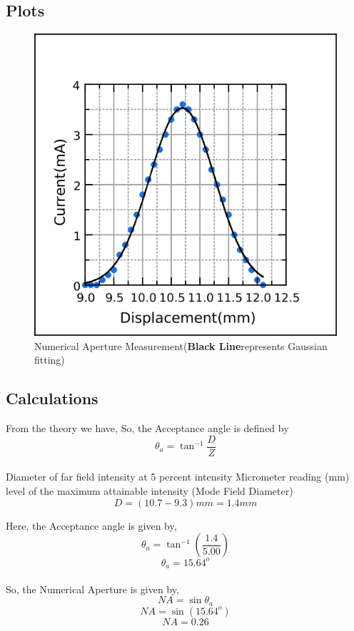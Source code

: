 \subsection{Plots}
\begin{figure}[H]
        \centering
        \includegraphics[width = 12 cm]{chapters/NA.png}
        \caption{Numerical Aperture Measurement(\textbf{Black Line}represents Gaussian fitting)}
    \end{figure}
    
\subsection{Calculations}

From the theory we have,
    So, the Acceptance angle is defined by \\
    $$ \theta_{a} = \tan^{-1}\frac{D}{Z}$$ \\
   
    Diameter of far field intensity at 5 percent intensity Micrometer reading (mm) level of the maximum attainable intensity (Mode Field Diameter)
    $$ D = (10.7 - 9.3) mm = 1.4  mm$$
    
    Here, the Acceptance angle is given by,
    $$ \theta_{a} = \tan^{-1}\left(\frac{1.4}{5.00}\right) $$
    $$ \theta_{a} = 15.64^{o}$$ \\
    So, the Numerical Aperture is given by,
    $$ NA = \sin{\theta_{a}} $$
    $$ NA = \sin{(15.64^{o})}$$
    $$ NA = 0.26 $$
   
